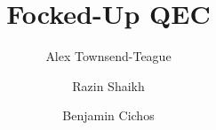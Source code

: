 \title{Focked-Up QEC}

\author{Alex Townsend-Teague}
\author{Razin Shaikh}
\author{Benjamin Cichos}

\maketitle